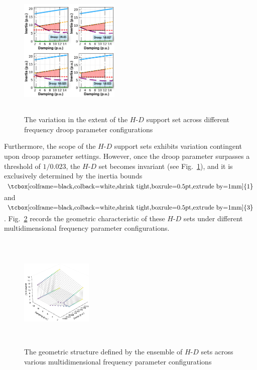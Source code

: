 \documentclass[lettersize,journal]{IEEEtran}
\newcommand{\ciao}[1]{{\setlength\fboxrule{0pt}\fbox{\tcbox[colframe=black,colback=white,shrink tight,boxrule=0.5pt,extrude by=1mm]{\small #1}}}}
\begin{document}
\vspace{-0.25cm}

\begin{figure}[!h]
  \centering
  \includegraphics[width=0.425\textwidth,height=6.5cm]{inertia_damping_feasible_region.pdf}\vspace{-0.125cm}
  \caption{The variation in the extent of the $H$-$D$ support set across different frequency droop parameter configurations}\vspace{-0.25cm}
  \label{fig:inertia_damping_feasible_region}
\end{figure}

Furthermore, the scope of the $H$-$D$ support sets exhibits variation contingent upon droop parameter settings. However, once the droop parameter surpasses a threshold of $1/0.023$, the $H$-$D$ set becomes invariant (see Fig.~\ref{fig:inertia_damping_feasible_region}), and it is exclusively determined by the inertia bounds $\ciao{1}$ and $\ciao{3}$. Fig.~\ref{fig:diff_inertia_damping_supportset} records the geometric characteristic of these $H$-$D$ sets under different multidimensional frequency parameter configurations.

\begin{figure}[!t]
	\centering
	\includegraphics[width=0.305\textwidth,height = 5.5cm]{diff_inertia_damping_supportset.pdf}\vspace{-0.25cm}
	\caption{The geometric structure defined by the ensemble of $H$-$D$ sets across various multidimensional frequency parameter configurations}\vspace{-0.25cm}
	\label{fig:diff_inertia_damping_supportset}
\end{figure}
\end{document}
